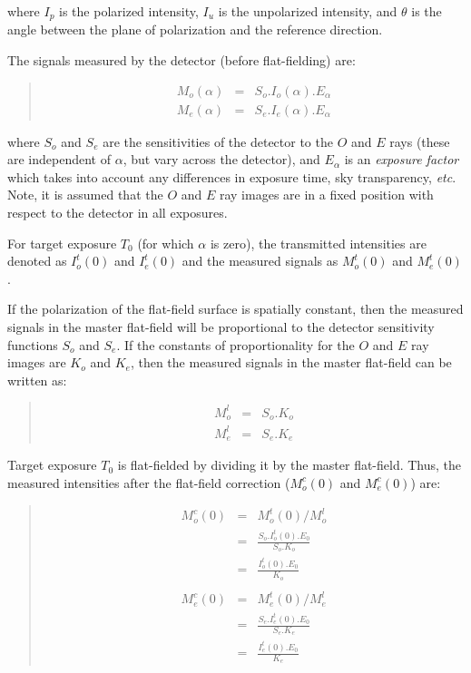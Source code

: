 \documentclass[twoside,11pt]{starlink}
\newenvironment{myquote}{\begin{quote}\begin{small}}{\end{small}\end{quote}}
\begin{document}
where $I_{p}$ is the polarized intensity, $I_{u}$ is the unpolarized
intensity, and $\theta$ is the angle between the plane of polarization
and the reference direction.

The signals measured by the detector (before flat-fielding) are:

\begin{myquote}
\begin{eqnarray*}
  M_{o}(\alpha) & = & S_{o}.I_{o}(\alpha).E_{\alpha} \\
  M_{e}(\alpha) & = & S_{e}.I_{e}(\alpha).E_{\alpha}
\end{eqnarray*}
\end{myquote}

where $S_{o}$ and $S_{e}$ are the sensitivities of the detector to the $O$
and $E$ rays (these are independent of $\alpha$, but vary across the
detector), and $E_{\alpha}$ is an \emph{exposure factor} which takes into
account any differences in exposure time, sky transparency, \emph{etc}. Note, it
is assumed that the $O$ and $E$ ray images are in a fixed position
with respect to the detector in all exposures.

For target exposure $T_{0}$ (for which $\alpha$ is zero), the transmitted
intensities are denoted as $I^{t}_{o}(0)$ and $I^{t}_{e}(0)$ and the
measured signals as $M^{t}_{o}(0)$ and $M^{t}_{e}(0)$.

If the polarization of the flat-field surface is spatially constant, then
the measured signals in the master flat-field will be proportional to
the detector sensitivity functions $S_{o}$ and $S_{e}$. If the constants
of proportionality for the $O$ and $E$ ray images are $K_{o}$ and
$K_{e}$, then the measured signals in the master flat-field can be
written as:

\begin{myquote}
\begin{eqnarray*}
  M^l_{o} & = & S_{o}.K_{o} \\
  M^l_{e} & = & S_{e}.K_{e}
\end{eqnarray*}
\end{myquote}

Target exposure $T_{0}$ is flat-fielded by dividing it by the master
flat-field. Thus, the measured intensities after the flat-field correction
($M^{c}_{o}(0)$ and $M^{c}_{e}(0)$) are:

\begin{myquote}
\begin{eqnarray*}
  M^{c}_{o}(0) & = & M^{t}_{o}(0) / M^{l}_{o} \\
                    & = & \frac{ S_{o}.I^{t}_{o}(0).E_{0} }{ S_{o}.K_{o} } \\
                    & = & \frac{ I^{t}_{o}(0).E_{0} }{ K_{o} } \\ \\
  M^{c}_{e}(0) & = & M^{t}_{e}(0) / M^{l}_{e} \\
                    & = & \frac{ S_{e}.I^{t}_{e}(0).E_{0} }{ S_{e}.K_{e} } \\
                    & = & \frac{ I^{t}_{e}(0).E_{0} }{ K_{e} }
\end{eqnarray*}
\end{myquote}
\end{document}
